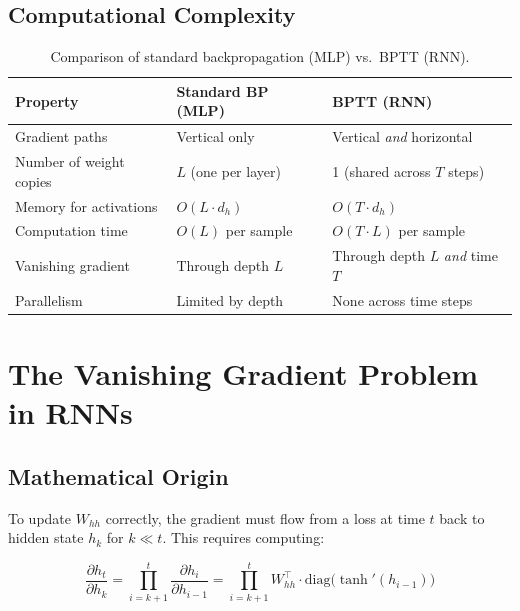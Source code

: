 \documentclass[12pt,a4paper]{article}
\newcommand{\Whh}{W_{hh}}
\begin{document}
\subsection{Computational Complexity}
\label{subsec:bptt_complexity}

\begin{table}[ht]
\centering
\caption{Comparison of standard backpropagation (MLP) vs.\ BPTT (RNN).}
\label{tab:bp_vs_bptt}
\renewcommand{\arraystretch}{1.35}
\begin{tabular}{@{}lll@{}}
\toprule
\textbf{Property} & \textbf{Standard BP (MLP)} & \textbf{BPTT (RNN)} \\
\midrule
Gradient paths       & Vertical only             & Vertical \emph{and} horizontal \\
Number of weight copies & $L$ (one per layer)    & 1 (shared across $T$ steps) \\
Memory for activations & $O(L \cdot d_h)$        & $O(T \cdot d_h)$ \\
Computation time     & $O(L)$ per sample         & $O(T \cdot L)$ per sample \\
Vanishing gradient   & Through depth $L$         & Through depth $L$ \emph{and} time $T$ \\
Parallelism          & Limited by depth          & None across time steps \\
\bottomrule
\end{tabular}
\end{table}

\section{The Vanishing Gradient Problem in RNNs}
\label{sec:vanishing}

\subsection{Mathematical Origin}
\label{subsec:vanishing_math}

To update $\Whh$ correctly, the gradient must flow from a loss at time $t$
back to hidden state $h_k$ for $k \ll t$.  This requires computing:

\begin{equation}
  \frac{\partial h_t}{\partial h_k}
  = \prod_{i=k+1}^{t} \frac{\partial h_i}{\partial h_{i-1}}
  = \prod_{i=k+1}^{t} \Whh^{\top} \cdot
    \mathrm{diag}\!\bigl(\tanh'(h_{i-1})\bigr)
  \label{eq:gradient_product}
\end{equation}
\end{document}

